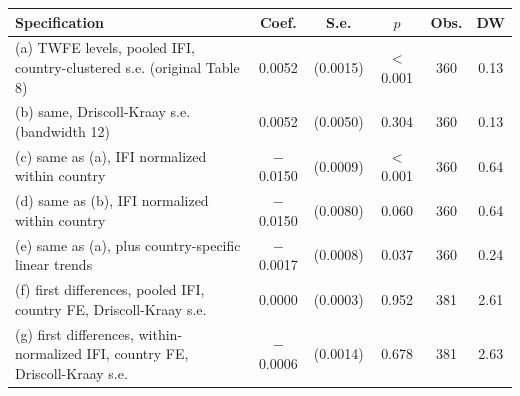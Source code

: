 \begin{tabular}{@{} L{7.6cm} ccccc @{}}
\toprule
\textbf{Specification} & \textbf{Coef.} & \textbf{S.e.} & $p$ & \textbf{Obs.} & \textbf{DW} \\
\midrule
(a) TWFE levels, pooled IFI, country-clustered s.e. (original Table 8) & 0.0052 & (0.0015) & $<$0.001 & 360 & 0.13 \\
(b) same, Driscoll-Kraay s.e. (bandwidth 12) & 0.0052 & (0.0050) & 0.304 & 360 & 0.13 \\
(c) same as (a), IFI normalized within country & $-$0.0150 & (0.0009) & $<$0.001 & 360 & 0.64 \\
(d) same as (b), IFI normalized within country & $-$0.0150 & (0.0080) & 0.060 & 360 & 0.64 \\
(e) same as (a), plus country-specific linear trends & $-$0.0017 & (0.0008) & 0.037 & 360 & 0.24 \\
\midrule
(f) first differences, pooled IFI, country FE, Driscoll-Kraay s.e. & 0.0000 & (0.0003) & 0.952 & 381 & 2.61 \\
(g) first differences, within-normalized IFI, country FE, Driscoll-Kraay s.e. & $-$0.0006 & (0.0014) & 0.678 & 381 & 2.63 \\
\bottomrule
\end{tabular}